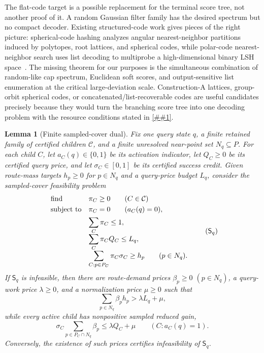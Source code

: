 \documentclass[10pt]{article}
\newcommand{\cref}[1]{\ref{##1}}
\newtheorem{lemma}[theorem]{Lemma}
\theoremstyle{definition}
\begin{document}
The flat-code target is a possible replacement for the terminal score tree, not
another proof of it.  A random Gaussian filter family has the desired spectrum
but no compact decoder.  Existing structured-code work gives pieces of the
right picture: spherical-code hashing analyzes angular nearest-neighbor
partitions induced by polytopes, root lattices, and spherical codes, while
polar-code nearest-neighbor search uses list decoding to multiprobe a
high-dimensional binary LSH space~\cite{Laa20,TH23}.  The missing theorem for
our purposes is the simultaneous combination of random-like cap spectrum,
Euclidean soft scores, and output-sensitive list enumeration at the critical
large-deviation scale.  Construction-A lattices, group-orbit spherical codes,
or concatenated/list-recoverable codes are useful candidates precisely because
they would turn the branching score tree into one decoding problem with the
resource conditions stated in \cref{asm:flat-spherical-code-decoder}.

\begin{lemma}[Finite sampled-cover dual]
   \label{lem:finite-sampled-cover-dual}
   Fix one query state $q$, a finite retained family of certified children
   $\mathcal C$, and a finite unresolved near-point set $N_q\subseteq P$.  For
   each child $C$, let $a_C(q)\in\{0,1\}$ be its activation indicator, let
   $Q_C\ge0$ be its certified query price, and let $\sigma_C\in[0,1]$ be its
   certified success credit.  Given route-mass targets $h_p\ge0$ for
   $p\in N_q$ and a query-price budget $L_q$, consider the sampled-cover
   feasibility problem
   \[
   \begin{array}{ll}
   \text{\rm find} & \pi_C\ge0\qquad(C\in\mathcal C)\\[0.3em]
   \text{\rm subject to}
      & \pi_C=0\qquad(a_C(q)=0),\\[0.4em]
      & \displaystyle \sum_C\pi_C\le1,\\[0.8em]
      & \displaystyle \sum_C\pi_CQ_C\le L_q,\\[0.8em]
      & \displaystyle
        \sum_{C:p\in P_C}\pi_C\sigma_C\ge h_p
        \qquad(p\in N_q).
   \end{array}
   \tag{$\mathsf S_q$}
   \]
   If $\mathsf S_q$ is infeasible, then there are route-demand prices
   $\beta_p\ge0$ $(p\in N_q)$, a query-work price $\lambda\ge0$, and a
   normalization price $\mu\ge0$ such that
   \[
      \sum_{p\in N_q}\beta_ph_p>\lambda L_q+\mu,
      \tag{SD1}
   \]
   while every active child has nonpositive sampled reduced gain,
   \[
      \sigma_C\sum_{p\in P_C\cap N_q}\beta_p
      \le
      \lambda Q_C+\mu
      \qquad(C:a_C(q)=1).
      \tag{SD2}
   \]
   Conversely, the existence of such prices certifies infeasibility of
   $\mathsf S_q$.
\end{lemma}
\end{document}
